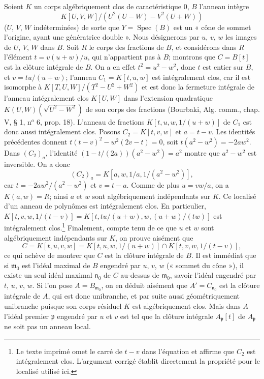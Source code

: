 \documentclass[10pt,oneside]{book}
\newcommand{\oldpage}[2][]{%
  \setcounter{footnote}{0}%
  \marginpar{\scriptsize\textbf{#1}~|~#2}\ignorespaces}
\begin{document}
\oldpage[IV-2]{177}
Soient $K$ un corps algébriquement clos de caractéristique 0, $B$ l'anneau
intègre
\[
K[U,V,W]/(U^2(U-W)-V^2(U+W))
\]
($U$, $V$, $W$ indéterminées) de sorte que $Y=\operatorname{Spec}(B)$ est
un « cône de sommet l'origine, ayant une génératrice double ». Nous
désignerons par $u$, $v$, $w$ les images de $U$, $V$, $W$ dans $B$. Soit
$R$ le corps des fractions de $B$, et considérons dans $R$ l'élément
$t=v(u+w)/u$, qui n'appartient pas à $B$; montrons que $C=B[t]$ est la
clôture intégrale de $B$. On a en effet $t^2=u^2-w^2$, donc $t$ est entier
sur $B$, et $v=tu/(u+w)$; l'anneau $C_1=K[t,u,w]$ est intégralement clos,
car il est isomorphe à
$K[T,U,W]/(T^2-U^2+W^2)$ et est donc la fermeture intégrale de l'anneau
intégralement clos $K[U,W]$ dans l'extension quadratique
$K(U,W)(\sqrt{U^2-W^2})$ de son corps des fractions (Bourbaki, Alg. comm.,
chap. V, § 1, n$^o$ 6, prop. 18). L'anneau de fractions
$K[t,u,w,1/(u+w)]$ de $C_1$ est donc aussi intégralement clos. Posons $C_2=K[t,v,w]$ et $a=t-v$. Les identités précédentes donnent
$t(t-v)^2-w^2(2v-t)=0$, soit $t(a^2-w^2)=-2aw^2$.
Dans $(C_2)_a$, l'identité $(1-t/(2a))(a^2-w^2)=a^2$ montre que
$a^2-w^2$ est inversible. On a donc
\[
(C_2)_a=K[a,w,1/a,1/(a^2-w^2)],
\]
car $t=-2aw^2/(a^2-w^2)$ et $v=t-a$. Comme de plus $u=vw/a$,
on a $K(a,w)=R$; ainsi $a$ et $w$ sont algébriquement indépendants sur $K$.
Ce localisé d'un anneau de polynômes est intégralement clos. En particulier,
$K[t,v,w,1/(t-v)]=K[t,tu/(u+w),w,(u+w)/(tw)]$ est intégralement clos.\footnote{Le texte imprimé omet le carré de $t-v$ dans l'équation et affirme que $C_2$ est intégralement clos. L'argument corrigé établit directement la propriété pour le localisé utilisé ici.}
Finalement, compte tenu de ce
que $u$ et $w$ sont algébriquement indépendants sur $K$, on prouve aisément
que
\[
C=K[t,u,v,w]=K[t,u,w,1/(u+w)]\cap K[t,v,w,1/(t-v)],
\]
ce qui achève de montrer que $C$ est la clôture intégrale de $B$. Il est
immédiat que si $\mathfrak m_0$ est l'idéal maximal de $B$ engendré par
$u$, $v$, $w$ (« sommet du cône »), il existe un seul idéal maximal
$\mathfrak n_0$ de $C$ au-dessus de $\mathfrak m_0$, savoir l'idéal
engendré par $t$, $u$, $v$, $w$. Si l'on pose $A=B_{\mathfrak m_0}$, on en
déduit aisément que $A'=C_{\mathfrak n_0}$ est la clôture intégrale de
$A$, qui est donc unibranche, et par suite aussi géométriquement unibranche
puisque son corps résiduel $K$ est algébriquement clos. Mais dans $A$
l'idéal premier $\mathfrak p$ engendré par $u$ et $v$ est tel que la
clôture intégrale $A_\mathfrak p[t]$ de $A_\mathfrak p$ ne soit pas un
anneau local.
\end{document}

